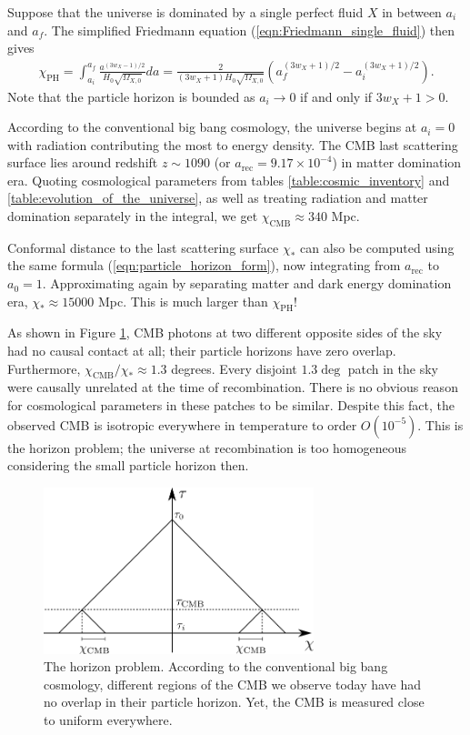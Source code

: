 Suppose that the universe is dominated by a single perfect fluid $X$ in between $a_i$ and $a_f$. The simplified Friedmann equation (\ref{eqn:Friedmann_single_fluid}) then gives
\begin{align}
	\chi_\text{PH} = \int_{a_i}^{a_f} \frac{a^{(3w_X - 1)/2}}{H_0 \sqrt{\Omega_{X,0}}} da = \frac{2}{(3w_X+1) H_0 \sqrt{\Omega_{X,0}}} \left( a_f^{(3w_X+1)/2} - a_i^{(3w_X+1)/2} \right). \label{eqn:particle_horizon_form}
\end{align}
Note that the particle horizon is bounded as $a_i \rightarrow 0$ if and only if $3w_X+1>0$.

According to the conventional big bang cosmology, the universe begins at $a_i=0$ with radiation contributing the most to energy density. The CMB last scattering surface lies around redshift $z \sim 1090$ (or $a_\text{rec}=9.17\times 10^{-4}$) in matter domination era. Quoting cosmological parameters from tables \ref{table:cosmic_inventory} and \ref{table:evolution_of_the_universe}, as well as treating radiation and matter domination separately in the integral, we get $\chi_\text{CMB} \approx 340$ Mpc.

Conformal distance to the last scattering surface $\chi_*$ can also be computed using the same formula (\ref{eqn:particle_horizon_form}), now integrating from $a_\text{rec}$ to $a_0=1$. Approximating again by separating matter and dark energy domination era, $\chi_* \approx 15000$ Mpc. This is much larger than $\chi_\text{PH}$!

As shown in Figure \ref{fig:horizon_problem}, CMB photons at two different opposite sides of the sky had no causal contact at all; their particle horizons have zero overlap. Furthermore, $\chi_\text{CMB}/\chi_* \approx 1.3$ degrees. Every disjoint $1.3\deg$ patch in the sky were causally unrelated at the time of recombination. There is no obvious reason for cosmological parameters in these patches to be similar. Despite this fact, the observed CMB is isotropic everywhere in temperature to order $O(10^{-5})$. This is the horizon problem; the universe at recombination is too homogeneous considering the small particle horizon then.
\begin{figure}[htbp!] 
	\centering    
	\includegraphics[width=0.7\textwidth]{horizon_problem.png}
	\caption{The horizon problem. According to the conventional big bang cosmology, different regions of the CMB we observe today have had no overlap in their particle horizon. Yet, the CMB is measured close to uniform everywhere.}
	\label{fig:horizon_problem}
\end{figure}

